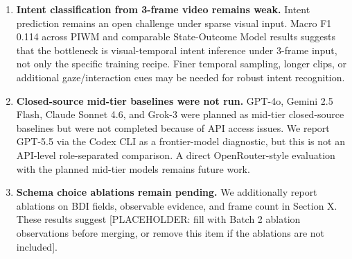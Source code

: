 \begin{enumerate}
    \item \textbf{Intent classification from 3-frame video remains weak.}
    Intent prediction remains an open challenge under sparse visual input. Macro F1 0.114 across PIWM and comparable State-Outcome Model results suggests that the bottleneck is visual-temporal intent inference under 3-frame input, not only the specific training recipe. Finer temporal sampling, longer clips, or additional gaze/interaction cues may be needed for robust intent recognition.

    \item \textbf{Closed-source mid-tier baselines were not run.}
    GPT-4o, Gemini 2.5 Flash, Claude Sonnet 4.6, and Grok-3 were planned as mid-tier closed-source baselines but were not completed because of API access issues. We report GPT-5.5 via the Codex CLI as a frontier-model diagnostic, but this is not an API-level role-separated comparison. A direct OpenRouter-style evaluation with the planned mid-tier models remains future work.

    \item \textbf{Schema choice ablations remain pending.}
    We additionally report ablations on BDI fields, observable evidence, and frame count in Section X. These results suggest [PLACEHOLDER: fill with Batch 2 ablation observations before merging, or remove this item if the ablations are not included].
\end{enumerate}

